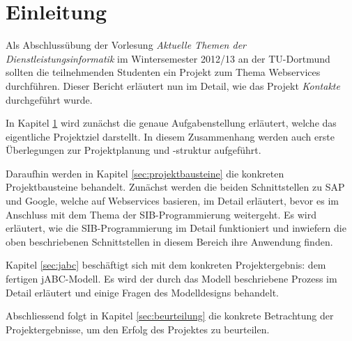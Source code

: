 \javalstset{}{}
\section{Einleitung}
\label{sec:einleitung}
Als Abschlussübung der Vorlesung \emph{Aktuelle Themen der Dienstleistungsinformatik} im Wintersemester
 2012/13 an der TU-Dortmund sollten die teilnehmenden Studenten ein Projekt zum Thema Webservices
 durchführen. Dieser Bericht erläutert nun im Detail, wie das Projekt \textit{Kontakte} durchgeführt wurde.

In Kapitel \ref{sec:einleitung} wird zunächst die genaue Aufgabenstellung erläutert, welche das
 eigentliche Projektziel darstellt. In diesem Zusammenhang werden auch erste Überlegungen zur Projektplanung
 und -struktur aufgeführt.

Daraufhin werden in Kapitel \ref{sec:projektbausteine} die konkreten Projektbausteine behandelt. Zunächst
 werden die beiden Schnittstellen zu SAP und Google, welche auf Webservices basieren, im Detail erläutert,
 bevor es im Anschluss mit dem Thema der SIB-Programmierung weitergeht. Es wird erläutert, wie die
 SIB-Programmierung im Detail funktioniert und inwiefern die oben beschriebenen Schnittstellen in diesem
 Bereich ihre Anwendung finden.

Kapitel \ref{sec:jabc} beschäftigt sich mit dem konkreten Projektergebnis: dem fertigen jABC-Modell.
 Es wird der durch das Modell beschriebene Prozess im Detail erläutert und einige Fragen des Modelldesigns behandelt.

Abschliessend folgt in Kapitel \ref{sec:beurteilung} die konkrete Betrachtung der Projektergebnisse,
 um den Erfolg des Projektes zu beurteilen. 


